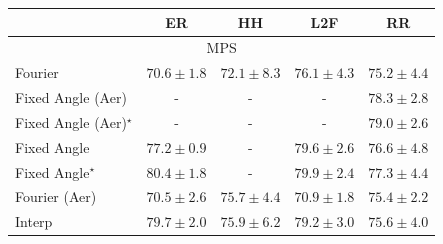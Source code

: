 \begin{tabular}{l|cccc|}
\toprule
            & ER & HH & L2F & RR \\
\midrule
\multicolumn{5}{c}{\rule{0pt}{8pt}MPS} \\
\midrule
Fourier & {\cellcolor[HTML]{FFF1AE}} \color[HTML]{000000} $70.6\pm 1.8$ & {\cellcolor[HTML]{FEE596}} \color[HTML]{000000} $72.1\pm 8.3$ & {\cellcolor[HTML]{FEB23F}} \color[HTML]{000000} $76.1\pm 4.3$ & {\cellcolor[HTML]{FEC14C}} \color[HTML]{000000} $75.2\pm 4.4$ \\
Fixed Angle (Aer) & {\cellcolor[HTML]{000000}} \color[HTML]{F1F1F1} {\cellcolor{white}} \color{black} - & {\cellcolor[HTML]{000000}} \color[HTML]{F1F1F1} {\cellcolor{white}} \color{black} - & {\cellcolor[HTML]{000000}} \color[HTML]{F1F1F1} {\cellcolor{white}} \color{black} - & {\cellcolor[HTML]{FA8F24}} \color[HTML]{F1F1F1} $78.3\pm 2.8$ \\
Fixed Angle (Aer)$^\star$ & {\cellcolor[HTML]{000000}} \color[HTML]{F1F1F1} {\cellcolor{white}} \color{black} - & {\cellcolor[HTML]{000000}} \color[HTML]{F1F1F1} {\cellcolor{white}} \color{black} - & {\cellcolor[HTML]{000000}} \color[HTML]{F1F1F1} {\cellcolor{white}} \color{black} - & {\cellcolor[HTML]{F5841E}} \color[HTML]{F1F1F1} $79.0\pm 2.6$ \\
Fixed Angle & {\cellcolor[HTML]{FEA030}} \color[HTML]{000000} $77.2\pm 0.9$ & {\cellcolor[HTML]{000000}} \color[HTML]{F1F1F1} {\cellcolor{white}} \color{black} - & {\cellcolor[HTML]{F17B1A}} \color[HTML]{F1F1F1} $79.6\pm 2.6$ & {\cellcolor[HTML]{FEAA38}} \color[HTML]{000000} $76.6\pm 4.8$ \\
Fixed Angle$^\star$ & {\cellcolor[HTML]{EA6E13}} \color[HTML]{F1F1F1} $80.4\pm 1.8$ & {\cellcolor[HTML]{000000}} \color[HTML]{F1F1F1} {\cellcolor{white}} \color{black} - & {\cellcolor[HTML]{EE7617}} \color[HTML]{F1F1F1} $79.9\pm 2.4$ & {\cellcolor[HTML]{FE9F2E}} \color[HTML]{000000} $77.3\pm 4.4$ \\
Fourier (Aer) & {\cellcolor[HTML]{FFF1B0}} \color[HTML]{000000} $70.5\pm 2.6$ & {\cellcolor[HTML]{FEB945}} \color[HTML]{000000} $75.7\pm 4.4$ & {\cellcolor[HTML]{FFEEA9}} \color[HTML]{000000} $70.9\pm 1.8$ & {\cellcolor[HTML]{FEBE4A}} \color[HTML]{000000} $75.4\pm 2.2$ \\
Interp & {\cellcolor[HTML]{F07919}} \color[HTML]{F1F1F1} $79.7\pm 2.0$ & {\cellcolor[HTML]{FEB643}} \color[HTML]{000000} $75.9\pm 6.2$ & {\cellcolor[HTML]{F4811D}} \color[HTML]{F1F1F1} $79.2\pm 3.0$ & {\cellcolor[HTML]{FEBA46}} \color[HTML]{000000} $75.6\pm 4.0$ \\

\end{tabular}
